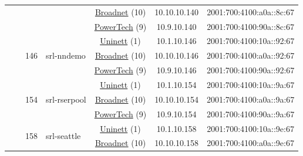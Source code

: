 \begin{small}
\begin{center}
\begin{longtable}{|c|c|c|c|c|c|c|c|}
  &  &  &  & \multicolumn{2}{|c|}{\tiny{\href{https://www.broadnet.no}{Broadnet} (10)}} & \tiny{10.10.10.140} & \tiny{2001:700:4100:a0a::8c:67} \\* \cline{5-5}\cline{6-6}\cline{7-7}\cline{8-8}
  &  &  &  & \multicolumn{2}{|c|}{\tiny{\href{http://www.powertech.no}{PowerTech} (9)}} & \tiny{10.9.10.140} & \tiny{2001:700:4100:90a::8c:67} \\* \cline{3-3}\cline{4-4}\cline{5-5}\cline{6-6}\cline{7-7}\cline{8-8}
  &  & \multirow{3}{*}{\tiny{146}} & \multicolumn{1}{|l|}{\multirow{3}{*}{\tiny{srl-nndemo}}} & \multicolumn{2}{|c|}{\tiny{\href{https://www.uninett.no}{Uninett} (1)}} & \tiny{10.1.10.146} & \tiny{2001:700:4100:10a::92:67} \\* \cline{5-5}\cline{6-6}\cline{7-7}\cline{8-8}
  &  &  &  & \multicolumn{2}{|c|}{\tiny{\href{https://www.broadnet.no}{Broadnet} (10)}} & \tiny{10.10.10.146} & \tiny{2001:700:4100:a0a::92:67} \\* \cline{5-5}\cline{6-6}\cline{7-7}\cline{8-8}
  &  &  &  & \multicolumn{2}{|c|}{\tiny{\href{http://www.powertech.no}{PowerTech} (9)}} & \tiny{10.9.10.146} & \tiny{2001:700:4100:90a::92:67} \\* \cline{3-3}\cline{4-4}\cline{5-5}\cline{6-6}\cline{7-7}\cline{8-8}
  &  & \multirow{3}{*}{\tiny{154}} & \multicolumn{1}{|l|}{\multirow{3}{*}{\tiny{srl-rserpool}}} & \multicolumn{2}{|c|}{\tiny{\href{https://www.uninett.no}{Uninett} (1)}} & \tiny{10.1.10.154} & \tiny{2001:700:4100:10a::9a:67} \\* \cline{5-5}\cline{6-6}\cline{7-7}\cline{8-8}
  &  &  &  & \multicolumn{2}{|c|}{\tiny{\href{https://www.broadnet.no}{Broadnet} (10)}} & \tiny{10.10.10.154} & \tiny{2001:700:4100:a0a::9a:67} \\* \cline{5-5}\cline{6-6}\cline{7-7}\cline{8-8}
  &  &  &  & \multicolumn{2}{|c|}{\tiny{\href{http://www.powertech.no}{PowerTech} (9)}} & \tiny{10.9.10.154} & \tiny{2001:700:4100:90a::9a:67} \\* \cline{3-3}\cline{4-4}\cline{5-5}\cline{6-6}\cline{7-7}\cline{8-8}
  &  & \multirow{3}{*}{\tiny{158}} & \multicolumn{1}{|l|}{\multirow{3}{*}{\tiny{srl-seattle}}} & \multicolumn{2}{|c|}{\tiny{\href{https://www.uninett.no}{Uninett} (1)}} & \tiny{10.1.10.158} & \tiny{2001:700:4100:10a::9e:67} \\* \cline{5-5}\cline{6-6}\cline{7-7}\cline{8-8}
  &  &  &  & \multicolumn{2}{|c|}{\tiny{\href{https://www.broadnet.no}{Broadnet} (10)}} & \tiny{10.10.10.158} & \tiny{2001:700:4100:a0a::9e:67} \\* \cline{5-5}\cline{6-6}\cline{7-7}\cline{8-8}

\end{longtable}
\end{center}
\end{small}
